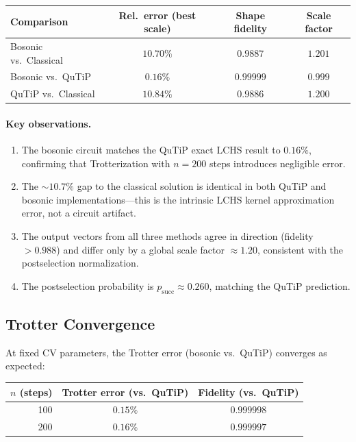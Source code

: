 \documentclass[11pt]{article}
\begin{document}
\begin{center}
\begin{tabular}{lccc}
  \toprule
  Comparison & Rel.\ error (best scale) & Shape fidelity & Scale factor \\
  \midrule
  Bosonic vs.\ Classical & $10.70\%$ & $0.9887$ & $1.201$ \\
  Bosonic vs.\ QuTiP & $\mathbf{0.16\%}$ & $\mathbf{0.99999}$ & $0.999$ \\
  QuTiP vs.\ Classical & $10.84\%$ & $0.9886$ & $1.200$ \\
  \bottomrule
\end{tabular}
\end{center}

\paragraph{Key observations.}
\begin{enumerate}[itemsep=2pt]
  \item The bosonic circuit matches the QuTiP exact LCHS result to $0.16\%$,
        confirming that Trotterization with $n=200$ steps introduces negligible error.
  \item The $\sim\!10.7\%$ gap to the classical solution is identical in both
        QuTiP and bosonic implementations---this is the intrinsic LCHS kernel
        approximation error, not a circuit artifact.
  \item The output vectors from all three methods agree in direction
        (fidelity $> 0.988$) and differ only by a global scale factor
        $\approx 1.20$, consistent with the postselection normalization.
  \item The postselection probability is $p_{\mathrm{succ}} \approx 0.260$,
        matching the QuTiP prediction.
\end{enumerate}

\subsection{Trotter Convergence}

At fixed CV parameters, the Trotter error (bosonic vs.\ QuTiP) converges
as expected:

\begin{center}
\begin{tabular}{rcc}
  \toprule
  $n$ (steps) & Trotter error (vs.\ QuTiP) & Fidelity (vs.\ QuTiP) \\
  \midrule
  100 & $0.15\%$ & $0.999998$ \\
  200 & $0.16\%$ & $0.999997$ \\
  \bottomrule
\end{tabular}
\end{center}
\end{document}
